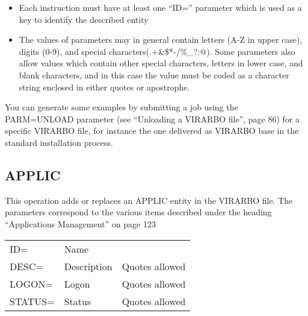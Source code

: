 \documentclass[letterpaper,10pt,english]{sphinxmanual}
\begin{document}
\begin{itemize}
\item {} 
Each instruction must have at least one “ID=” parameter which is used as a key to identify the described entity

\item {} 
The values of parameters may in general contain letters (A-Z in upper case), digits (0-9), and special characters(.+\&\$*-/\%\_?:@). Some parameters also allow values which contain other special characters, letters in lower case, and blank characters, and in this case the value must be coded as a character string enclosed in either quotes or apostrophe.

\end{itemize}

You can generate some examples by submitting a job using the PARM=UNLOAD parameter (see “Unloading a VIRARBO file”, page 86) for a specific VIRARBO file, for instance the one delivered as VIRARBO base in the standard installation process.


\subsection{APPLIC}
\label{\detokenize{Installation_Guide:index-159}}\label{\detokenize{Installation_Guide:applic}}
This operation adds or replaces an APPLIC entity in the VIRARBO file. The parameters correspond to the various items
described under the heading “Applications Management” on page 123


\begin{savenotes}\sphinxattablestart
\centering
\begin{tabulary}{\linewidth}[t]{|T|T|T|}
\hline
{}\relax &\relax &\relax \\
\hline
ID=
&
Name
&\\
\hline
DESC=
&
Description
&
Quotes allowed
\\
\hline
LOGON=
&
Logon
&
Quotes allowed
\\
\hline
STATUS=
&
Status
&
Quotes allowed
\\
\hline
\end{tabulary}
\par
\sphinxattableend\end{savenotes}
\end{document}
